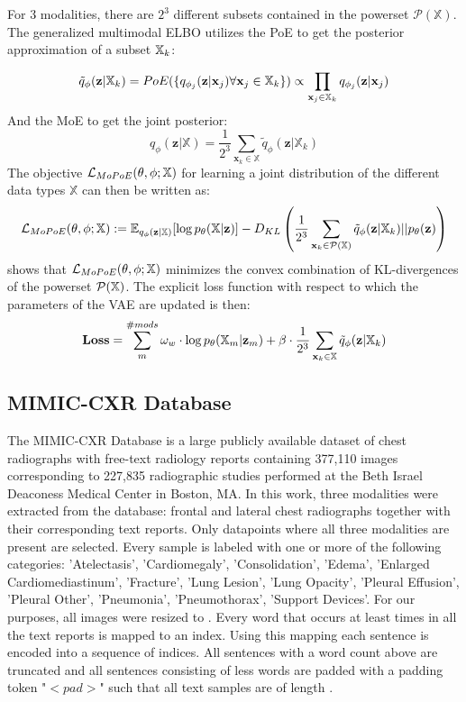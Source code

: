 For 3 modalities, there are $2^3$ different subsets contained in the powerset $\mathcal{P}(\mathbb{X})$. %
The generalized multimodal ELBO utilizes the PoE to get the posterior approximation of a subset $\mathbb{X}_k$:

\begin{equation}
    \tilde{q}_{\phi}(\textbf{z}|\mathbb{X}_k)=PoE(\{q_{\phi_j}(\textbf{z}|\textbf{x}_j) \forall \textbf{x}_j \in \mathbb{X}_k\}) \propto \prod _{\textbf{x}_j \in \mathbb{X}_k}q_{\phi_j}(\textbf{z}|\textbf{x}_j)
\end{equation}
And the MoE to get the joint posterior:
\begin{equation}
    q_{\phi}(\textbf{z}|\mathbb{X}) = \frac{1}{2^3} \sum _{\textbf{x}_k \in \mathbb{X}} \tilde{q}_{\phi} (\textbf{z}|\mathbb{X}_k)
\end{equation}
The objective $\mathcal{L}_{MoPoE}(\theta, \phi; \mathbb{X})$ for learning a joint distribution of the different data types $\mathbb{X}$ can then be written as:
\begin{equation}
    \mathcal{L}_{MoPoE}(\theta, \phi; \mathbb{X}) := \mathbb{E}_{q_{\phi}(\textbf{z}|\mathbb{X})}[\log p_{\theta}(\mathbb{X}|\textbf{z})] - D_{KL} \left( \frac{1}{2^3} \sum _{\textbf{x}_k \in \mathcal{P}(\mathbb{X})} \tilde{q}_{\phi} (\textbf{z}|\mathbb{X}_k)||p_{\theta}(\textbf{z})\right)
\end{equation}
\cite{thomas_gener-ELBO} shows that $\mathcal{L}_{MoPoE}(\theta, \phi; \mathbb{X})$ minimizes the convex combination of KL-divergences of the powerset $\mathcal{P}(\mathbb{X})$.
The explicit loss function with respect to which the parameters of the VAE are updated is then:
\begin{equation}
    \textbf{Loss} = \sum _m ^{\#mods} \omega _w \cdot \log p_{\theta}(\mathbb{X}_m|\textbf{z}_m) + \beta \cdot \frac{1}{2^3} \sum _{\textbf{x}_k \in \mathbb{X}} \tilde{q}_{\phi}(\textbf{z}|\mathbb{X}_k)
\end{equation}

\subsection{MIMIC-CXR Database}
The MIMIC-CXR Database \cite{johnson2019mimic} is a large publicly available dataset of chest radiographs with free-text radiology reports containing 377,110 images corresponding to 227,835 radiographic studies performed at the Beth Israel Deaconess Medical Center in Boston, MA.
In this work, three modalities were extracted from the database: frontal and lateral chest radiographs together with their corresponding text reports. Only datapoints where all three modalities are present are selected.
Every sample is labeled with one or more of the following categories: 'Atelectasis', 'Cardiomegaly', 'Consolidation', 'Edema', 'Enlarged Cardiomediastinum', 'Fracture', 'Lung Lesion', 'Lung Opacity', 'Pleural Effusion', 'Pleural Other', 'Pneumonia', 'Pneumothorax', 'Support Devices'.
For our purposes, all images were resized to \imgsize.
Every word that occurs at least \minwordocc times in all the text reports is mapped to an index.
Using this mapping each sentence is encoded into a sequence of indices.
All sentences with a word count above \sentlen are truncated and all sentences consisting of less words are padded with a padding token "$<pad>$" such that all text samples are of length \sentlen.

